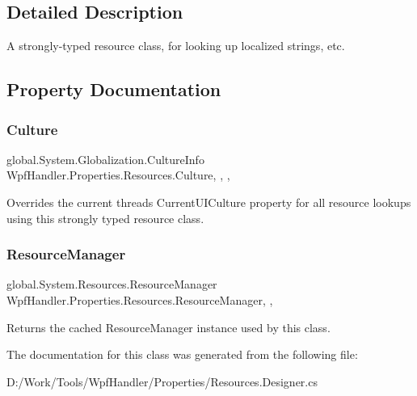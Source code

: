 \subsection{Detailed Description}
A strongly-\/typed resource class, for looking up localized strings, etc. 



\subsection{Property Documentation}
\mbox{\label{class_wpf_handler_1_1_properties_1_1_resources_a9d6eb037cf7891a3ed5b2370e7dfdc23}} 
\subsubsection{\texorpdfstring{Culture}{Culture}}
{\footnotesize\ttfamily global.\+System.\+Globalization.\+Culture\+Info Wpf\+Handler.\+Properties.\+Resources.\+Culture\hspace{0.3cm}{\ttfamily [static]}, {\ttfamily [get]}, {\ttfamily [set]}, {\ttfamily [package]}}



Overrides the current thread\textquotesingle{}s Current\+U\+I\+Culture property for all resource lookups using this strongly typed resource class. 

\mbox{\label{class_wpf_handler_1_1_properties_1_1_resources_a4908c4924066b6d42cc0e042fdae5079}} 
\subsubsection{\texorpdfstring{Resource\+Manager}{ResourceManager}}
{\footnotesize\ttfamily global.\+System.\+Resources.\+Resource\+Manager Wpf\+Handler.\+Properties.\+Resources.\+Resource\+Manager\hspace{0.3cm}{\ttfamily [static]}, {\ttfamily [get]}, {\ttfamily [package]}}



Returns the cached Resource\+Manager instance used by this class. 



The documentation for this class was generated from the following file\+:\begin{DoxyCompactItemize}
\item 
D\+:/\+Work/\+Tools/\+Wpf\+Handler/\+Properties/Resources.\+Designer.\+cs\end{DoxyCompactItemize}
